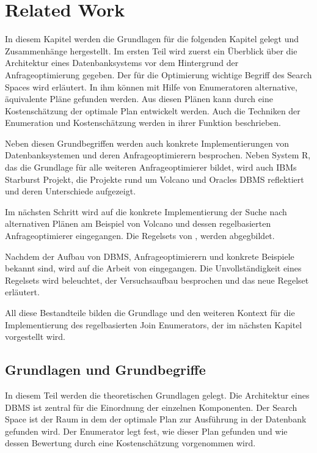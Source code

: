 \chapter{Related Work}


In diesem Kapitel werden die Grundlagen für die folgenden Kapitel gelegt und Zusammenhänge hergestellt. Im ersten Teil wird zuerst ein Überblick über die Architektur eines Datenbanksystems vor dem Hintergrund der Anfrageoptimierung gegeben. Der für die Optimierung wichtige Begriff des Search Spaces wird erläutert. In ihm können mit Hilfe von Enumeratoren alternative, äquivalente Pläne gefunden werden. Aus diesen Plänen kann  durch eine Kostenschätzung der optimale Plan entwickelt werden. Auch die Techniken der Enumeration und Kostenschätzung werden in ihrer Funktion beschrieben.

Neben diesen Grundbegriffen werden auch konkrete Implementierungen von Datenbanksystemen und deren Anfrageoptimierern besprochen. Neben System R, das die Grundlage für alle weiteren Anfrageoptimierer bildet, wird auch IBMs Starburst Projekt, die Projekte rund um Volcano und Oracles DBMS reflektiert und deren Unterschiede aufgezeigt.

Im nächsten Schritt wird auf die konkrete Implementierung der Suche nach alternativen Plänen am Beispiel von Volcano und dessen regelbasierten Anfrageoptimierer eingegangen. Die Regelsets von \cite{pellenkoft1997complexity}, \cite{pellenkoft1997duplicate} werden abgegbildet.

Nachdem der Aufbau von DBMS, Anfrageoptimierern und konkrete Beispiele bekannt sind, wird auf die Arbeit von \cite{shanbhag2014optimizing} eingegangen. Die Unvollständigkeit eines Regelsets wird beleuchtet, der Versuchsaufbau besprochen und das neue Regelset erläutert.

All diese Bestandteile bilden die Grundlage und den weiteren Kontext für die Implementierung des regelbasierten Join Enumerators, der im nächsten Kapitel vorgestellt wird.






\section{Grundlagen und Grundbegriffe}

In diesem Teil werden die theoretischen Grundlagen gelegt. Die Architektur eines DBMS ist zentral für die Einordnung der einzelnen Komponenten. Der Search Space ist der Raum in dem der optimale Plan zur Ausführung in der Datenbank gefunden wird. Der Enumerator legt fest, wie dieser Plan gefunden und wie  dessen Bewertung durch eine Kostenschätzung vorgenommen wird.


